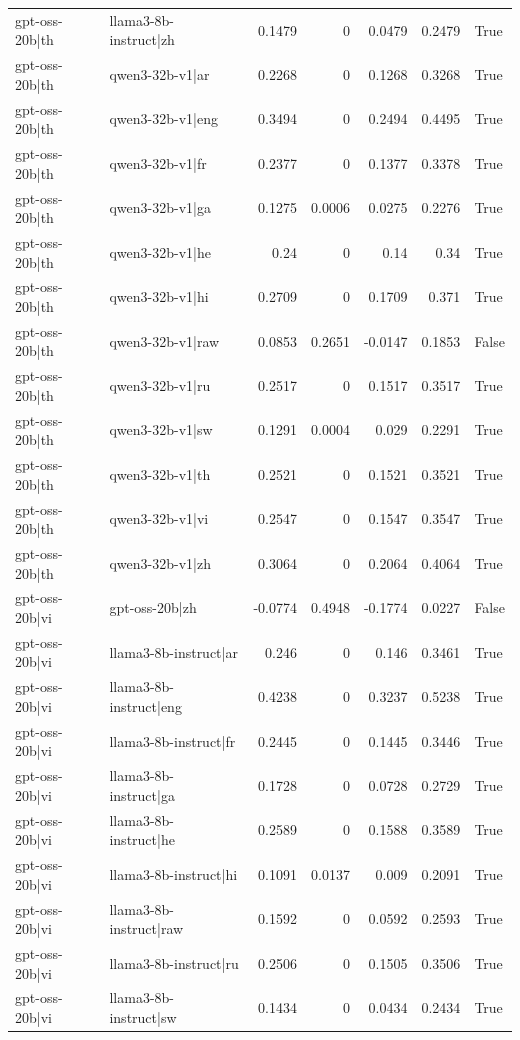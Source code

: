 \begin{table}
\begin{tabular}{l l r r r r l}
gpt-oss-20b|th & llama3-8b-instruct|zh & 0.1479 & 0 & 0.0479 & 0.2479 & True \\
gpt-oss-20b|th & qwen3-32b-v1|ar & 0.2268 & 0 & 0.1268 & 0.3268 & True \\
gpt-oss-20b|th & qwen3-32b-v1|eng & 0.3494 & 0 & 0.2494 & 0.4495 & True \\
gpt-oss-20b|th & qwen3-32b-v1|fr & 0.2377 & 0 & 0.1377 & 0.3378 & True \\
gpt-oss-20b|th & qwen3-32b-v1|ga & 0.1275 & 0.0006 & 0.0275 & 0.2276 & True \\
gpt-oss-20b|th & qwen3-32b-v1|he & 0.24 & 0 & 0.14 & 0.34 & True \\
gpt-oss-20b|th & qwen3-32b-v1|hi & 0.2709 & 0 & 0.1709 & 0.371 & True \\
gpt-oss-20b|th & qwen3-32b-v1|raw & 0.0853 & 0.2651 & -0.0147 & 0.1853 & False \\
gpt-oss-20b|th & qwen3-32b-v1|ru & 0.2517 & 0 & 0.1517 & 0.3517 & True \\
gpt-oss-20b|th & qwen3-32b-v1|sw & 0.1291 & 0.0004 & 0.029 & 0.2291 & True \\
gpt-oss-20b|th & qwen3-32b-v1|th & 0.2521 & 0 & 0.1521 & 0.3521 & True \\
gpt-oss-20b|th & qwen3-32b-v1|vi & 0.2547 & 0 & 0.1547 & 0.3547 & True \\
gpt-oss-20b|th & qwen3-32b-v1|zh & 0.3064 & 0 & 0.2064 & 0.4064 & True \\
gpt-oss-20b|vi & gpt-oss-20b|zh & -0.0774 & 0.4948 & -0.1774 & 0.0227 & False \\
gpt-oss-20b|vi & llama3-8b-instruct|ar & 0.246 & 0 & 0.146 & 0.3461 & True \\
gpt-oss-20b|vi & llama3-8b-instruct|eng & 0.4238 & 0 & 0.3237 & 0.5238 & True \\
gpt-oss-20b|vi & llama3-8b-instruct|fr & 0.2445 & 0 & 0.1445 & 0.3446 & True \\
gpt-oss-20b|vi & llama3-8b-instruct|ga & 0.1728 & 0 & 0.0728 & 0.2729 & True \\
gpt-oss-20b|vi & llama3-8b-instruct|he & 0.2589 & 0 & 0.1588 & 0.3589 & True \\
gpt-oss-20b|vi & llama3-8b-instruct|hi & 0.1091 & 0.0137 & 0.009 & 0.2091 & True \\
gpt-oss-20b|vi & llama3-8b-instruct|raw & 0.1592 & 0 & 0.0592 & 0.2593 & True \\
gpt-oss-20b|vi & llama3-8b-instruct|ru & 0.2506 & 0 & 0.1505 & 0.3506 & True \\
gpt-oss-20b|vi & llama3-8b-instruct|sw & 0.1434 & 0 & 0.0434 & 0.2434 & True \\

\end{tabular}
\end{table}
